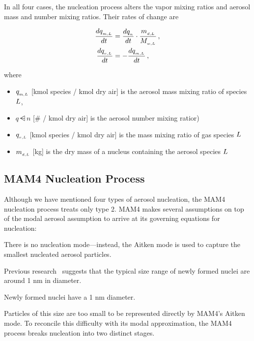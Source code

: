 In all four cases, the nucleation process alters the vapor mixing ratios and
aerosol mass and number mixing ratios. Their rates of change are

\begin{align}
\frac{d q\dsub{m,\specidx}}{dt} &= \frac{d q\dsub{n}}{dt} \cdot \frac{m\dsub{d,\specidx}}{\mw{\specidx}} \,, \labeleq{nuc:aer}\\
\frac{d\vmass{\specidx}}{dt} &= -\frac{d q\dsub{m,\specidx}}{dt} \,, \labeleq{nuc:gas}
\end{align}

where
\begin{itemize}
  \item $q_{_{m,L}}$ [kmol species / kmol dry air] is the aerosol mass
        mixing ratio of species $L$,
  \item $q\dsub{n}$ [\# / kmol dry air] is the aerosol number mixing ratior)
  \item $q_{_{v,L}}$ [kmol species / kmol dry air] is the mass mixing
        ratio of gas species $L$
  \item $m_{_{d,L}}$ [kg] is the dry mass of a nucleus containing the
        aerosol species $L$
\end{itemize}

\subsection{MAM4 Nucleation Process}

Although we have mentioned four types of aerosol nucleation, the MAM4 nucleation
process treats only type 2. MAM4 makes several assumptions on top of the modal
aerosol assumption to arrive at its governing equations for nucleation:

\begin{assume}
  There is no nucleation mode---instead, the Aitken mode is used to capture the
  smallest nucleated aerosol particles.
\end{assume}

Previous research~\cite{kerminen-2002-jas} suggests that the typical size
range of newly formed nuclei are around 1 nm in diameter.

\begin{assume}
  Newly formed nuclei have a 1 nm diameter.
\end{assume}

Particles of this size are too small to be represented directly by MAM4's Aitken
mode. To reconcile this difficulty with its modal approximation, the MAM4
process breaks nucleation into two distinct stages.

